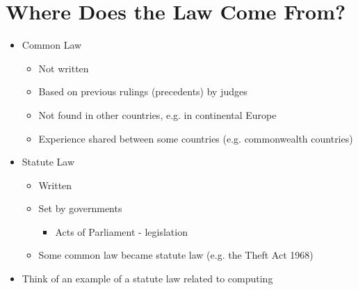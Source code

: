 \documentclass{article}
\begin{document}
\section{Where Does the Law Come From?}
\begin{itemize}
\item Common Law
\begin{itemize}
\item Not written
\item Based on previous rulings (precedents) by judges
\item Not found in other countries, e.g. in continental Europe
\item Experience shared between some countries (e.g. commonwealth countries)
\end{itemize}

\item Statute Law 
\begin{itemize}
\item Written 
\item Set by governments
\begin{itemize}
\item Acts of Parliament - legislation
\end{itemize}
\item Some common law became statute law (e.g. the Theft Act 1968)
\end{itemize}

\item Think of an example of a statute law related to computing
\end{itemize}
\end{document}
